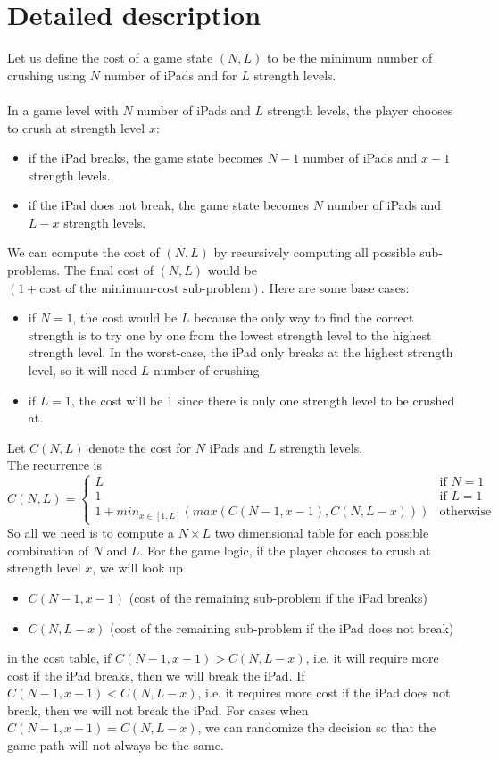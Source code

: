 \documentclass[12pt,a4paper,oneside]{report}
\begin{document}
\section{Detailed description}
Let us define the cost of a game state $(N, L)$ to be the minimum number of crushing using $N$ number of iPads and for $L$ strength levels. \\\\
In a game level with $N$ number of iPads and $L$ strength levels, the player chooses to crush at strength level $x$:
\begin{itemize}
\item if the iPad breaks, the game state becomes $N - 1$ number of iPads and $x - 1$ strength levels.
\item if the iPad does not break, the game state becomes $N$ number of iPads and $L - x$ strength levels.
\end{itemize}
We can compute the cost of $(N, L)$ by recursively computing all possible sub-problems. The final cost of $(N, L)$ would be $(1 + \text{cost of the minimum-cost sub-problem})$. Here are some base cases:
\begin{itemize}
\item if $N = 1$, the cost would be $L$ because the only way to find the correct strength is to try one by one from the lowest strength level to the highest strength level. In the worst-case, the iPad only breaks at the highest strength level, so it will need $L$ number of crushing.
\item if $L = 1$, the cost will be 1 since there is only one strength level to be crushed at.
\end{itemize}
Let $C(N, L)$ denote the cost for $N$ iPads and $L$ strength levels. \\
The recurrence is
\[
C(N, L) = 
\begin{cases}
L & \text{if $N = 1$} \\
1 & \text{if $L = 1$} \\
1 + min_{x \in [1, L]}(max(C(N - 1, x - 1), C(N, L - x))) & \text{otherwise}
\end{cases}
\]
So all we need is to compute a $N \times L$ two dimensional table for each possible combination of $N$ and $L$. For the game logic, if the player chooses to crush at strength level $x$, we will look up 
\begin{itemize}
\item $C(N - 1, x - 1)$ (cost of the remaining sub-problem if the iPad breaks)
\item $C(N, L - x)$ (cost of the remaining sub-problem if the iPad does not break)
\end{itemize}
in the cost table, if $C(N - 1, x - 1) > C(N, L - x)$, i.e. it will require more cost if the iPad breaks, then we will break the iPad. If $C(N - 1, x - 1) < C(N, L - x)$, i.e. it requires more cost if the iPad does not break, then we will not break the iPad. For cases when $C(N - 1, x - 1) = C(N, L - x)$, we can randomize the decision so that the game path will not always be the same.
\end{document}
